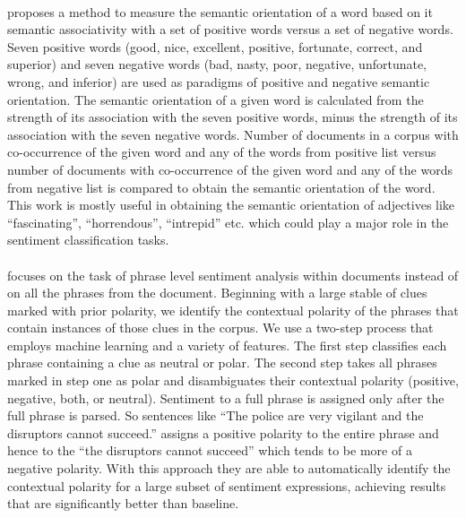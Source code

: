 \documentclass[a4paper,26pt]{article}
\begin{document}
\paragraph{}
\cite{turney2002unsupervised} proposes a method to measure the semantic orientation of a word based on it semantic associativity with a set of positive words versus a set of negative words. Seven positive words (good, nice, excellent, positive, fortunate, correct, and superior) and seven negative words (bad, nasty, poor, negative, unfortunate, wrong, and inferior) are used as paradigms of positive and negative semantic orientation. The semantic orientation of a given word is calculated from the strength of its association with the seven positive words, minus the strength of its association with the seven negative words. Number of documents in a corpus with co-occurrence of the given word and any of the words from positive list versus number of documents with co-occurrence of the given word and any of the words from negative list is compared to obtain the semantic orientation of the word. 
This work is mostly useful in obtaining the semantic orientation of adjectives like ``fascinating'', ``horrendous'', ``intrepid'' etc. which could play a major role in the sentiment classification tasks. 

\paragraph{}
\cite{wilson2005recognizing} focuses on the task of phrase level sentiment analysis within documents instead of on all the phrases from the document. Beginning with a large stable of clues marked with prior polarity, we identify the contextual polarity of the phrases that contain instances of those clues in the corpus. We use a two-step process that employs machine learning and a variety of features. The first step classifies each phrase containing a clue as neutral or polar. The second step takes all phrases marked in step one as polar and disambiguates their contextual polarity (positive, negative, both, or neutral). Sentiment to a full phrase is assigned only after the full phrase is parsed. So sentences like ``The police are very vigilant and the disruptors cannot succeed.'' assigns a positive polarity to the entire phrase and hence to the ``the disruptors cannot succeed'' which tends to be more of a negative polarity. With this approach they are able to automatically identify the contextual polarity for a large subset of sentiment expressions, achieving results that are significantly better than baseline.
\end{document}
